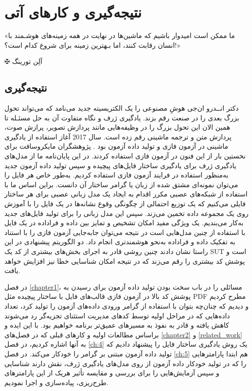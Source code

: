 
\chapter{نتیجه‌گیری و کارهای آتی}\label{ch:6}
\thispagestyle{empty}

\epigraph{
	«ما ممکن است امیدوار باشیم که ماشین‌ها در نهایت در همه زمینه‌های هوشـمند با انسان رقابت کنند، اما بـهترین زمینه برای شروع کدام است؟!»
}
{$ \maltese $ {\large آلِن تورینگ}}



\section{نتیجه‌گیری}
دکتر انــدرو ان‌جی
 هوشِ مصنوعی را یک الکتریسیته جدید می‌نامد که می‌تواند تحول بزرگ بعدی را در صنعت رقم بزند. یادگیری ژرف و نگاه متفاوت آن به حل مسئـله تا همین الان این تحول بزرگ را در وظیفه‌هایی مانند پردازش تصویر، پرازش صوت، پردازش متن و ترجمه ماشینی رقم زده‌ است. سال 2017 آغاز استفاده از یادگیری ماشینی در آزمون فازی و تولید داده آزمون بود
 \cite{Godefroid:2012:SWF:2090147.2094081, DBLP:journals/corr/abs-1711-04596}.
 پژوهشگران مایکروسافت برای نخستین بار از این فنون در آزمون فازی استفاده کردند. در این پایان‌نامه ما از مدل‌های یادگیری ژرف برای یادگیری ساختار فایل‌های پیچیده و سپس تولید داده آزمون جدید به‌منظور استفاده در فرایند آزمون فازی استفاده کردیم. به‌‌طور خاص هر فایل را می‌توان نمونه‌ای مشتق شده از زبان یا گرامر ساختار آن دانست. براین اساس ما با استفاده از شبکه‌های عصبی مکرر اقدام به ایجاد یک مدل زبانی عصبی برای هر ساختار فایلی می‌کنیم که یک توزیع احتمالی از چگونگی وقوع نشانه‌ها در یک فایل را با آموزش روی یک مجموعه داده تخمین می‌زند. سپس این مدل زبانی را برای تولید فایل‌های جدید به‌کار می‌بندیم. یک ویژگی مفید امکان تشخیص و تمایز بین داده و فراداده در یک فایل با استفاده از چنین مدل‌هایی است در نتیجه می‌توان جابه‌جایی آزمون فازی را با استناد به تفکیک داده و فراداده به‌نحو هوشمندتری انجام داد. دو الگوریتم پیشنهادی در این راستا نشان دادند چنین روشی قادر به اجرای بخش‌های بیشتری از کد یک  \gls{SUT} است و پوشش کد بیشتری را رقم می‌زند که در نتیجه امکان شناسایی خطا نیز افزایش خواهد یافت.
 
 در فصل \ref{chapter1}، مسائلی را در باب سخت بودن تولید داده آزمون برای رسیدن به پوشش کد بالا در آزمون فازی قالب‌های فایل با ساختار پیچیده مثل \gls{PDF} مطرح کردیم و دیدیم که چنان‌چه بتوان با استفاده از گرامر ورودی داده‌های آزمون را تولید کرد، تعداد داده‌هایی که در مراحل اولیه توسط کدهای مدیریت استثنای تجزیه‌گر رد می‌شوند کاهش یافته و قادر به نفوذ به مسیرهای عمیق‌تر برنامه خواهیم بود. با این ایده و براساس مطالعات اولیه و کارهای قبلی که در فصل‌های \ref{chapter2} و \ref{related_work} به آنها اشاره کردیم، در فصل \ref{ch:4} یک روش یادگیری ساختار فایل را پیشنهاد دادیم که تولید داده آزمون مبتنی بر گرامر را خودکار می‌کند. در فصل \ref{ch:5} هم ابتدا پارامترهایی را که در تولید خودکار داده آزمون از روی مدل‌های یادگیری ژرف، نقش دارند شناسایی و سپس آزمایش‌هایی را برای بررسی و مقایسه تأثیر هریک از این پارامترهای طرح‌ریزی، پیاده‌سازی و اجرا نمودیم.
 
